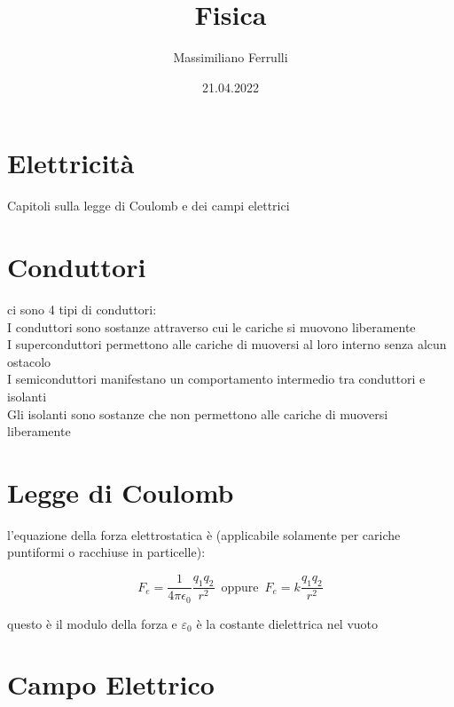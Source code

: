 \documentclass[a4paper,11pt]{article}
\begin{document}
    \title{Fisica}

    \author{Massimiliano Ferrulli}
    \date{21.04.2022}



    \maketitle

    \section*{Elettricità}
    Capitoli sulla legge di Coulomb e dei campi elettrici

    \pagebreak
    \tableofcontents
    \pagebreak

\section{Conduttori}
ci sono 4 tipi di conduttori:
\\
I conduttori sono sostanze attraverso cui le cariche si muovono liberamente
\\
I superconduttori permettono alle cariche di muoversi al loro interno senza alcun ostacolo
\\
I semiconduttori manifestano un comportamento intermedio tra conduttori e isolanti
\\
Gli isolanti sono sostanze che non permettono alle cariche di muoversi liberamente

\section{Legge di Coulomb}
l'equazione della forza elettrostatica è (applicabile solamente per cariche puntiformi o racchiuse in particelle):
\begin{center}
    \[
    F_e = \frac{1}{4\pi \epsilon_0}\frac{q_1 q_2}{r^2} \, \, \,  \text{oppure} \, \, \, F_e = k  \frac{q_1 q_2}{r^2}
    \]
\end{center}
questo è il modulo della forza e \( \varepsilon_0\) è la costante dielettrica nel vuoto

\section{Campo Elettrico}
\end{document}
